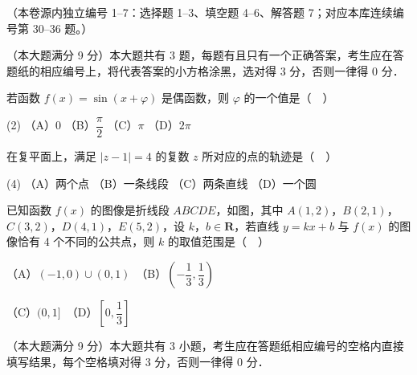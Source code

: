 （本卷源内独立编号 1–7：选择题 1–3、填空题 4–6、解答题 7；对应本库连续编号第 30–36 题。）


（本大题满分 9 分）本大题共有 3 题，每题有且只有一个正确答案，考生应在答题纸的相应编号上，将代表答案的小方格涂黑，选对得 3 分，否则一律得 0 分．

\begin{question}
若函数 \(f(x)=\sin(x+\varphi)\) 是偶函数，则 \(\varphi\) 的一个值是（　）

\begin{gkopts}(2)
\task （A）0
\task （B）\(\dfrac{\pi}{2}\)
\task （C）\(\pi\)
\task （D）\(2\pi\)
\end{gkopts}

\end{question}
\begin{question}
在复平面上，满足 \(|z-1|=4\) 的复数 \(z\) 所对应的点的轨迹是（　）

\begin{gkopts}(4)
\task （A）两个点
\task （B）一条线段
\task （C）两条直线
\task （D）一个圆
\end{gkopts}

\Needspace{0.4\textheight}
\end{question}
\begin{question}
已知函数 \(f(x)\) 的图像是折线段 \(ABCDE\)，如图，其中 \(A(1,2)\)，\(B(2,1)\)，\(C(3,2)\)，\(D(4,1)\)，\(E(5,2)\)，设 \(k\)，\(b\in\mathbf{R}\)，若直线 \(y=kx+b\) 与 \(f(x)\) 的图像恰有 4 个不同的公共点，则 \(k\) 的取值范围是（　）
\nopagebreak[4]
\begin{center}\end{center}
\nopagebreak[4]
（A）\((-1,0)\cup(0,1)\)　（B）\(\left(-\dfrac{1}{3},\dfrac{1}{3}\right)\)

（C）\((0,1]\)　（D）\(\left[0,\dfrac{1}{3}\right]\)

\end{question}

（本大题满分 9 分）本大题共有 3 小题，考生应在答题纸相应编号的空格内直接填写结果，每个空格填对得 3 分，否则一律得 0 分．

